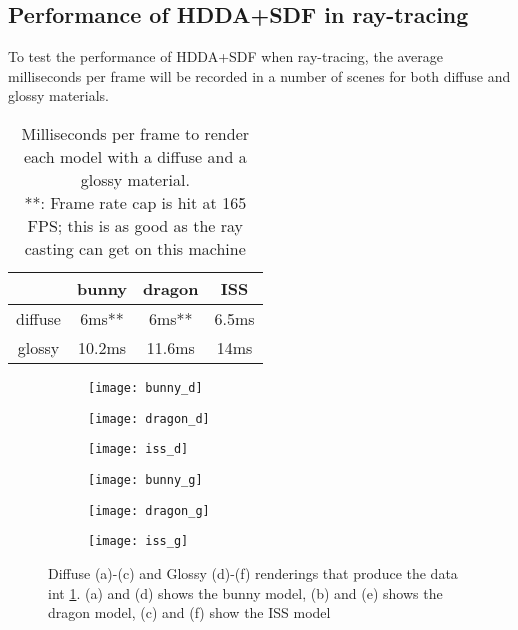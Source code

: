 \subsection{Performance of HDDA+SDF in ray-tracing}

To test the performance of HDDA+SDF when ray-tracing, the average milliseconds per frame will be recorded in a number of scenes for both diffuse and glossy materials.

\begin{table}[h]
  \centering
  \begin{tabular}{|c||c|c|c|}
    \hline
    & bunny & dragon & ISS \\
    \hline
    diffuse & 6ms** & 6ms** & 6.5ms \\
    \hline
    glossy & 10.2ms & 11.6ms & 14ms \\
    \hline
  \end{tabular}
  \caption{Milliseconds per frame to render each model with a diffuse and a glossy material. \\
    **: Frame rate cap is hit at 165 FPS; this is as good as the ray casting can get on this machine}
  \label{sdf_test}
\end{table}


\begin{figure}[H]
  \centering
  \begin{subfigure}[b]{0.32\textwidth}
    \texttt{[image: bunny\_d]}
    \caption{}
  \end{subfigure}
  \hfill
  \begin{subfigure}[b]{0.32\textwidth}
    \texttt{[image: dragon\_d]}
    \caption{}
  \end{subfigure}
  \hfill
  \begin{subfigure}[b]{0.32\textwidth}
    \texttt{[image: iss\_d]}
    \caption{}
  \end{subfigure}
  \hfill
  \begin{subfigure}[b]{0.32\textwidth}
    \texttt{[image: bunny\_g]}
    \caption{}
  \end{subfigure}
  \hfill
  \begin{subfigure}[b]{0.32\textwidth}
    \texttt{[image: dragon\_g]}
    \caption{}
  \end{subfigure}
  \hfill
  \begin{subfigure}[b]{0.32\textwidth}
    \texttt{[image: iss\_g]}
    \caption{}
  \end{subfigure}
  \caption{Diffuse (a)-(c) and Glossy (d)-(f) renderings that produce the data int \cref{sdf_test}. (a) and (d) shows the bunny model, (b) and (e) shows the dragon model, (c) and (f) show the ISS model}
\end{figure}


